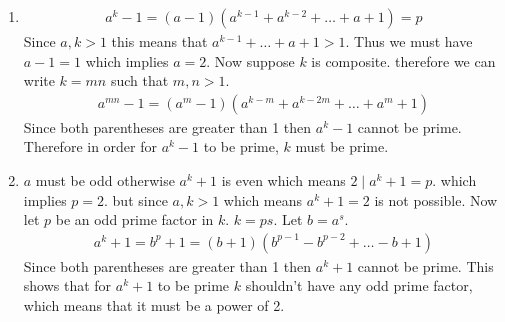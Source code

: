 \begin{enumerate}[label=\textbf{(\textit{\roman*})}]
    \item 
        \begin{gather*}
            a^k - 1 = (a - 1) (a^{k - 1} + a^{k - 2} + \dots + a + 1) = p
        \end{gather*}
        Since $a, k > 1$ this means that $a^{k - 1} + \dots + a + 1 > 1$.
        Thus we must have $a - 1= 1$ which implies $ a= 2$.
        Now suppose $k$ is composite. therefore we can write $k = mn$ such that $m, n > 1$.
        \begin{gather*}
            a^{mn} - 1 = (a^m - 1)(a^{k - m} + a^{k - 2m} + \dots + a^{m} + 1)
        \end{gather*}
        Since both parentheses are greater than 1 then $a^k - 1$ cannot be prime.
        Therefore in order for $a^k - 1$ to be prime, $k$ must be prime.
    \item 
        $a$ must be odd otherwise $a^k + 1$ is even which means $2 \mid a^k + 1 = p$.
        which implies $p = 2$. but since $a, k > 1$ which means $a^k + 1 = 2 $ is not possible.
        Now let $p$ be an odd prime factor in $k$. $k = ps$. Let $b = a^s$.
        \begin{gather*}
            a^k + 1 = b^p + 1 = (b + 1) (b^{p - 1} - b^{p - 2} + \dots - b + 1)
        \end{gather*}
        Since both parentheses are greater than 1 then $a^k + 1$ cannot be prime. This shows that for $a^k + 1$ to be prime $k$ shouldn't have any odd prime factor, which means that it must be a power of 2.
\end{enumerate}